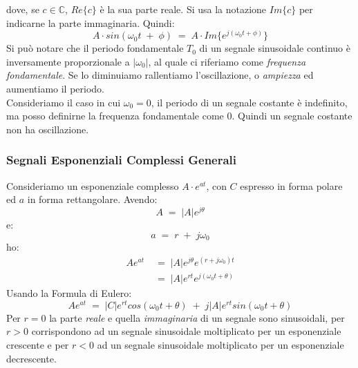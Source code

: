 \documentclass{article}
\begin{document}
				dove, se $ c \in \mathbb{C}$, $ Re\{c\} $ è la sua parte reale. Si usa la notazione $ Im\{c\} $ per indicarne la parte immaginaria. Quindi:
				\[
					A\cdot sin(\omega_0t\; +\; \phi)\; =\; A\cdot Im\{e^{j(\omega_0t+\phi)}\}
				\]
				Si può notare che il periodo fondamentale $ T_0 $ di un segnale sinusoidale continuo è inversamente proporzionale a $ \left|\omega_0\right| $, al quale ci riferiamo come \textit{frequenza fondamentale}. Se lo diminuiamo rallentiamo l'oscillazione, o \textit{ampiezza} ed aumentiamo il periodo. \\
				Consideriamo il caso in cui $ \omega_0 = 0 $, il periodo di un segnale costante è indefinito, ma posso definirne la frequenza fondamentale come 0. Quindi un segnale costante non ha oscillazione.

			\subsubsection{Segnali Esponenziali Complessi Generali}
				Consideriamo un esponenziale complesso $ A\cdot e^{at} $, con $ C $ espresso in forma polare ed $ a $ in forma rettangolare.
				Avendo:
				\[
					A\; =\; \left|A\right|e^{j\theta}
				\]
				e:
				\[
					a\; =\; r\; +\; j\omega_0
				\]
				ho:
				\[
					\begin{aligned}
						Ae^{at}\; &=\; \left|A\right|e^{j\theta}e^{(r+j\omega_0)t} \\
								  &=\; \left|A\right|e^{rt}e^{j(\omega_0t+\theta)}
					\end{aligned}
				\]
				Usando la Formula di Eulero:
				\[
					Ae^{at}\; =\; \left|C\right|e^{rt}cos(\omega_0t+\theta)\; +\; j\left|A\right|e^{rt}sin(\omega_0t+\theta)
				\]
				Per $ r=0 $ la parte \textit{reale} e quella \textit{immaginaria} di un segnale sono sinusoidali, per $ r>0 $ corrispondono ad un segnale sinusoidale moltiplicato per un esponenziale crescente e per $ r<0 $ ad un segnale sinusoidale moltiplicato per un esponenziale decrescente. \\

				\def\cycles{16}
				\pgfmathsetmacro\cyclesminusone{\cycles-1}
\end{document}
